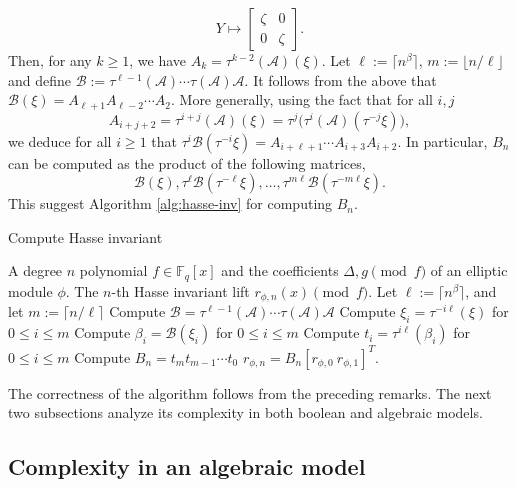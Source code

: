 \documentclass[12pt]{article}
\theoremstyle{plain}
\theoremstyle{definition}
\def\F{\ensuremath{\mathbb{F}}}
\begin{document}
\[Y \longmapsto 
\begin{bmatrix}
	\zeta & 0 \\
	0 & \zeta
\end{bmatrix}.
\]
Then, for any $k \ge 1$, we have $A_k = \tau^{k - 2}(\mathcal{A})(\xi)$. Let $\ell := \lceil 
n^\beta \rceil$, $m := \lfloor n / \ell \rfloor$ and define $\mathcal{B} := 
\tau^{\ell-1}(\mathcal{A}) \cdots \tau(\mathcal{A}) \mathcal{A}$. It follows from the above that 
$\mathcal{B}(\xi) = A_{\ell+1}A_{\ell - 2} \cdots A_2$. More generally, using the fact that for all 
$i, j$
\[A_{i + j + 2} = \tau^{i + j}(\mathcal{A})(\xi) = \tau^j\Big(\tau^i(\mathcal{A})(\tau^{-j}\xi) 
\Big),\]
we deduce for all $i \ge 1$ that $\tau^{i}\mathcal{B}(\tau^{-i}\xi) = A_{i + \ell+1} \cdots A_{i + 
3} A_{i + 2}$. In particular, $B_n$ can be computed as the product of the following matrices, 
\[
\mathcal{B} (\xi), \tau^{\ell}\mathcal{B}(\tau^{-\ell}\xi), \dots, \tau^{m \ell}\mathcal{B}( 
\tau^{-m \ell}\xi).
\]
This suggest Algorithm \ref{alg:hasse-inv} for computing $B_n$.
\begin{algorithm}[H]
	\caption{Compute Hasse invariant}
	\label{alg:hasse-inv}
	\begin{algorithmic}[1]
		\REQUIRE A degree $n$ polynomial $f \in \F_q[x]$ and the coefficients $\Delta, g \pmod{f}$ 
		of an elliptic module $\phi$.
		\ENSURE The $n$-th Hasse invariant lift $r_{\phi,n}(x) \pmod{f}$.
		\STATE Let $\ell := \lceil n^\beta \rceil$, and let $m := \lceil n / \ell \rceil$
		\STATE\label{step:hasse-2}
		Compute $\mathcal{B} = \tau^{\ell-1}(\mathcal{A}) \cdots \tau(\mathcal{A}) \mathcal{A}$
		\STATE\label{step:hasse-3}
		Compute $\xi_i = \tau^{-i\ell}(\xi)$ for $0 \le i \le m$
		\STATE\label{step:hasse-4}
		Compute $\beta_i = \mathcal{B}(\xi_i)$ for $0 \le i \le m$
		\STATE\label{step:hasse-5}
		Compute $t_i = \tau^{i\ell}(\beta_i)$ for $0 \le i \le m$
		\STATE\label{step:hasse-6} 
		Compute $B_n = t_m t_{m - 1} \cdots t_0$ 
		\RETURN\label{step:hasse-7}
		$r_{\phi,n} = B_n[r_{\phi,0} ~ r_{\phi,1}]^T$.
	\end{algorithmic}
\end{algorithm}
The correctness of the algorithm follows from the preceding remarks. The next two subsections 
analyze its complexity in both boolean and algebraic models.


\subsection{Complexity in an algebraic model}
\end{document}
